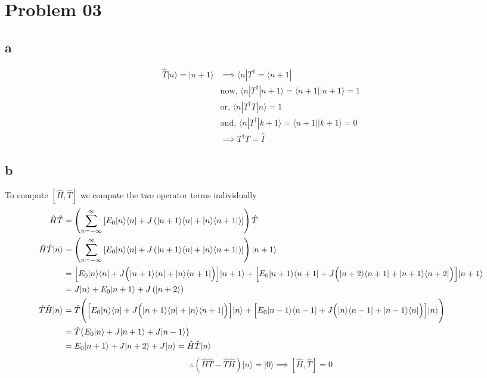 \documentclass[letter]{article}
\begin{document}
\newpage
\section*{Problem 03} 

\subsection*{a} 
\begin{align*}
	\hat{T} | n \rangle  = | n+1 \rangle  &\implies \langle n | T^\dagger = \langle n+1 | \\ 
					      &\text{now, } \langle n | T^\dagger | n+1 \rangle = 
					      \langle n+1 | | n+1 \rangle  = 1 \\ 
					      &\text{or, } 
					      \langle n | T^\dagger T | n \rangle = 1 \\  
					      &\text{and, } \langle n | T^\dagger | k+1 \rangle = 
					      \langle n+1| | k+1 \rangle \tag{$n\neq k$ } = 0 
					   \\ & \implies T^\dagger T = \hat{I}
\end{align*}


\subsection*{b}
To compute $\left[ \hat{H}, \hat{T} \right] $ we compute the two operator terms individually
\begin{align*}
	\hat{H} \hat{T} &= 
\left(
\sum_{n=-\infty}^{\infty} 
\left[
E_0 | n \rangle \langle n | + 
J 
\left(
| n+1 \rangle \langle n | + 
| n \rangle \langle n+1 | 
\right)
\right] 
%
\right) 
\hat{T} 
\\ \hat{H} \hat{T} | n \rangle  &= 
\left(
\sum_{n=-\infty}^{\infty} 
\left[
E_0 | n \rangle \langle n | + 
J 
\left(
| n+1 \rangle \langle n | + 
| n \rangle \langle n+1 | 
\right)
\right] 
%
\right)  | n+1 \rangle 
\\ 
&= 
\Bigl[
E_0 | n \rangle  \langle n | + 
J \Bigl(
| n+1 \rangle \langle n | + 
| n \rangle \langle n+1 | 
\Bigr)
\Bigr] | n+1 \rangle  + 
%
\Bigl[
E_0 | n+1 \rangle \langle n+1 | + 
J \Bigl(
| n+2 \rangle \langle n+1 | + 
| n+1 \rangle \langle n+2 | 
\Bigr)
\Bigr] | n+1 \rangle  
\\
&= 
J | n \rangle + 
E_0 | n + 1\rangle  + 
J 
\left(
| n+2 \rangle 
\right)
\\
\hat{T}\hat{H} | n \rangle  &= 
\hat{T}\Biggr(
\Bigl[
E_0 | n \rangle  \langle n | + 
J \Bigl(
| n+1 \rangle \langle n | + 
| n \rangle \langle n+1 | 
\Bigr)
\Bigr] | n \rangle  + 
%
\Bigl[
E_0 | n-1 \rangle \langle n-1 | + 
J
\Bigl(
| n \rangle \langle n-1 | + | n-1 \rangle \langle n | 
	\Bigr)
\Bigr] | n \rangle 
\Biggr) \\ 
&= 
\hat{T} \bigl(
E_0 | n \rangle + J | n+1 \rangle + J | n-1 \rangle 
\bigr) \\ 
&= E_0 | n+1 \rangle + J | n+2 \rangle + J | n \rangle  = \hat{H} \hat{T} | n \rangle \\
\end{align*} 
\[
\therefore \left(\hat{H}\hat{T} - \hat{T}\hat{H}\right) | n \rangle  = | 0 \rangle  \implies
\left[
	\hat{H}, \hat{T} 
\right] = 0
\] 
\end{document}
